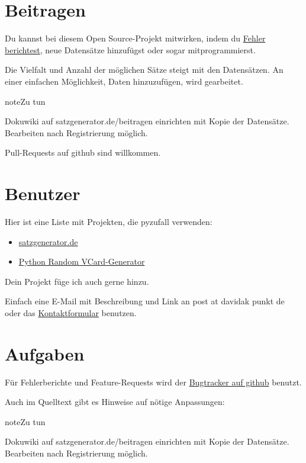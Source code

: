 \documentclass[a4paper,12pt,oneside]{sphinxmanual}
\begin{document}
\chapter{Beitragen}
\label{beitragen:beitragen}\label{beitragen::doc}
Du kannst bei diesem Open Source-Projekt mitwirken, indem du \href{https://github.com/davidak/pyzufall/issues/}{Fehler berichtest}, neue Datensätze hinzufügst oder sogar mitprogrammierst.

Die Vielfalt und Anzahl der möglichen Sätze steigt mit den Datensätzen. An einer einfachen Möglichkeit, Daten hinzuzufügen, wird gearbeitet.

\begin{notice}{note}{Zu tun}

Dokuwiki auf satzgenerator.de/beitragen einrichten mit Kopie der Datensätze. Bearbeiten nach Registrierung möglich.
\end{notice}

Pull-Requests auf github sind willkommen.


\chapter{Benutzer}
\label{benutzer::doc}\label{benutzer:benutzer}
Hier ist eine Liste mit Projekten, die pyzufall verwenden:
\begin{itemize}
\item {} 
\href{http://satzgenerator.de/}{satzgenerator.de}

\item {} 
\href{https://github.com/davidak/python-random-vcard-generator}{Python Random VCard-Generator}

\end{itemize}

Dein Projekt füge ich auch gerne hinzu.

Einfach eine E-Mail mit Beschreibung und Link an post at davidak punkt de oder das \href{http://davidak.de/kontakt}{Kontaktformular} benutzen.


\chapter{Aufgaben}
\label{todo::doc}\label{todo:aufgaben}
Für Fehlerberichte und Feature-Requests wird der \href{https://github.com/davidak/pyzufall/issues}{Bugtracker auf github} benutzt.

Auch im Quelltext gibt es Hinweise auf nötige Anpassungen:

\begin{notice}{note}{Zu tun}

Dokuwiki auf satzgenerator.de/beitragen einrichten mit Kopie der Datensätze. Bearbeiten nach Registrierung möglich.
\end{notice}
\end{document}
